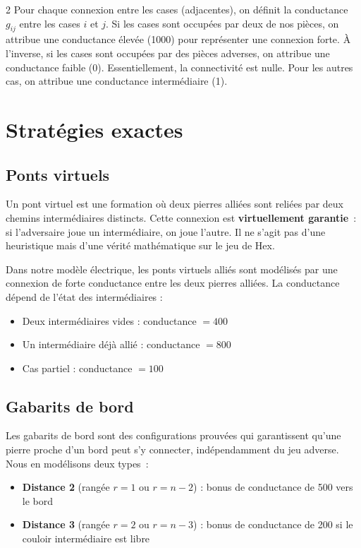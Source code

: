 \documentclass[11pt]{article}
\begin{document}
\begin{multicols}{2}
Pour chaque connexion entre les cases (adjacentes), on définit la conductance $g_{ij}$ entre les cases $i$ et $j$. Si les cases sont occupées par deux de nos pièces, on attribue une conductance élevée (1000) pour représenter une connexion forte. À l'inverse, si les cases sont occupées par des pièces adverses, on attribue une conductance faible (0). Essentiellement, la connectivité est nulle. Pour les autres cas, on attribue une conductance intermédiaire (1).

\section{Stratégies exactes}

\subsection{Ponts virtuels}

Un pont virtuel est une formation où deux pierres alliées sont reliées par deux chemins intermédiaires distincts. Cette connexion est \textbf{virtuellement garantie}~: si l'adversaire joue un intermédiaire, on joue l'autre. Il ne s'agit pas d'une heuristique mais d'une vérité mathématique sur le jeu de Hex.

Dans notre modèle électrique, les ponts virtuels alliés sont modélisés par une connexion de forte conductance entre les deux pierres alliées. La conductance dépend de l'état des intermédiaires :
\begin{itemize}
    \item Deux intermédiaires vides : conductance $= 400$
    \item Un intermédiaire déjà allié : conductance $= 800$
    \item Cas partiel : conductance $= 100$
\end{itemize}

\subsection{Gabarits de bord}

Les gabarits de bord sont des configurations prouvées qui garantissent qu'une pierre proche d'un bord peut s'y connecter, indépendamment du jeu adverse. Nous en modélisons deux types~:
\begin{itemize}
    \item \textbf{Distance 2} (rangée $r=1$ ou $r=n-2$) : bonus de conductance de 500 vers le bord
    \item \textbf{Distance 3} (rangée $r=2$ ou $r=n-3$) : bonus de conductance de 200 si le couloir intermédiaire est libre
\end{itemize}


\end{multicols}
\end{document}
